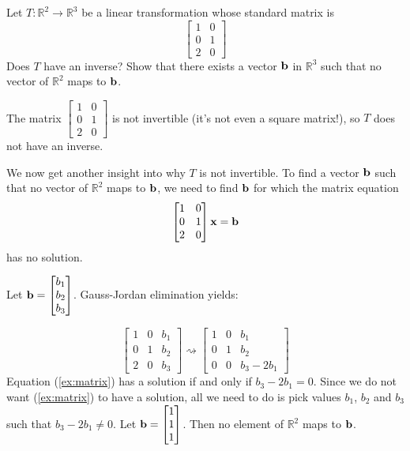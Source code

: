 \documentclass{ximera}
\renewcommand{\vec}[1]{{\bf #1}}
\newcommand{\RR}{\mathbb{R}}
\begin{document}
\begin{example}\label{ex:notonto} Let $T:\RR^2\rightarrow \RR^3$ be a linear transformation whose standard matrix is
$$\begin{bmatrix}1&0\\0&1\\2&0\end{bmatrix}$$
Does $T$ have an inverse? Show that there exists a vector $\vec{b}$ in $\RR^3$ such that no vector of $\RR^2$ maps to $\vec{b}$. 
\begin{explanation}
The matrix $\begin{bmatrix}1&0\\0&1\\2&0\end{bmatrix}$ is not invertible (it's not even a square matrix!), so $T$ does not have an inverse.

We now get another insight into why $T$ is not invertible.
To find a vector $\vec{b}$ such that no vector of $\RR^2$ maps to $\vec{b}$, we need to find $\vec{b}$ for which the matrix equation
\begin{align}\label{ex:matrix}\begin{bmatrix}1&0\\0&1\\2&0\end{bmatrix}\vec{x}=\vec{b}\end{align}
has no solution.  

Let $\vec{b}=\begin{bmatrix}b_1\\b_2\\b_3\end{bmatrix}$.  Gauss-Jordan elimination yields:

$$\left[\begin{array}{cc|c}  
 1 & 0 & b_1\\  
 0 & 1 & b_2\\
 2 & 0 & b_3
\end{array}\right] \rightsquigarrow \left[\begin{array}{cc|c} 
 1 & 0 & b_1\\  
 0 & 1 & b_2\\
 0 & 0 & b_3-2b_1
\end{array}\right]$$
Equation (\ref{ex:matrix}) has a solution if and only if $b_3-2b_1=0$.  Since we do not want (\ref{ex:matrix}) to have a solution, all we need to do is pick values $b_1$, $b_2$ and $b_3$ such that $b_3-2b_1\neq 0$.  Let $\vec{b}=\begin{bmatrix}1\\1\\1\end{bmatrix}$.  Then no element of $\RR^2$ maps to $\vec{b}$.
\end{explanation}
\end{example}
\end{document}
